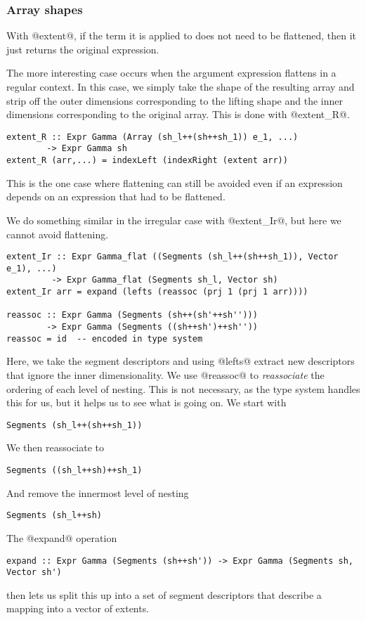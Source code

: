 \subsubsection{Array shapes}
With @extent@, if the term it is applied to does not need to be flattened, then it just returns the original expression.

The more interesting case occurs when the argument expression flattens in a regular context. In this case, we simply take the shape of the resulting array and strip off the outer dimensions corresponding to the lifting shape and the inner dimensions corresponding to the original array. This is done with @extent_R@.
%
\begin{lstlisting}[style=ndp]
extent_R :: Expr Gamma (Array (sh_l++(sh++sh_1)) e_1, ...)
        -> Expr Gamma sh
extent_R (arr,...) = indexLeft (indexRight (extent arr))
\end{lstlisting}
%
This is the one case where flattening can still be avoided even if an expression depends on an expression that had to be flattened.

We do something similar in the irregular case with @extent_Ir@, but here we cannot avoid flattening.
%
\begin{lstlisting}[style=ndp]
extent_Ir :: Expr Gamma_flat ((Segments (sh_l++(sh++sh_1)), Vector e_1), ...)
         -> Expr Gamma_flat (Segments sh_l, Vector sh)
extent_Ir arr = expand (lefts (reassoc (prj 1 (prj 1 arr))))

reassoc :: Expr Gamma (Segments (sh++(sh'++sh'')))
        -> Expr Gamma (Segments ((sh++sh')++sh''))
reassoc = id  -- encoded in type system
\end{lstlisting}
%
Here, we take the segment descriptors and using @lefts@ extract new descriptors that ignore the inner dimensionality. We use @reassoc@ to \emph{reassociate} the ordering of each level of nesting. This is not necessary, as the type system handles this for us, but it helps us to see what is going on. We start with
%
\begin{lstlisting}[style=ndp]
Segments (sh_l++(sh++sh_1))
\end{lstlisting}
%
We then reassociate to
%
\begin{lstlisting}[style=ndp]
Segments ((sh_l++sh)++sh_1)
\end{lstlisting}
%
And remove the innermost level of nesting
%
\begin{lstlisting}[style=ndp]
Segments (sh_l++sh)
\end{lstlisting}
%
The @expand@ operation
%
\begin{lstlisting}[style=ndp]
expand :: Expr Gamma (Segments (sh++sh')) -> Expr Gamma (Segments sh, Vector sh')
\end{lstlisting}
%
then lets us split this up into a set of segment descriptors that describe a mapping into a vector of extents.

